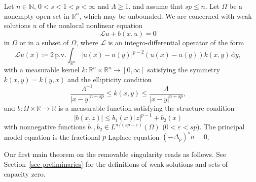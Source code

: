 \documentclass[11pt]{amsart}
\theoremstyle{plain}
\theoremstyle{definition}
\numberwithin{equation}{section}
\begin{document}
	Let $n \in \mathbb{N}$, $0<s<1<p<\infty$ and $\Lambda \geq 1$, and assume that $sp \leq n$. Let $\Omega$ be a nonempty open set in $\mathbb{R}^n$, which may be unbounded. We are concerned with weak solutions $u$ of the nonlocal nonlinear equation
	\begin{equation}\label{eq-main}
		\mathcal{L}u+b(x, u)=0
	\end{equation}
	in $\Omega$ or in a subset of $\Omega$, where $\mathcal{L}$ is an integro-differential operator of the form
	\begin{equation*}
		\mathcal{L}u(x) \coloneqq 2\, \mathrm{p.v.} \int_{\mathbb{R}^n} |u(x)-u(y)|^{p-2} (u(x)-u(y)) k(x, y) \,\mathrm{d}y,
	\end{equation*}
	with a measurable kernel $k: \mathbb{R}^n \times \mathbb{R}^n \to [0, \infty]$ satisfying the symmetry $k(x, y)=k(y, x)$ and the ellipticity condition
	\begin{equation}\label{eq-ellipticity}
		\frac{\Lambda^{-1}}{|x-y|^{n+sp}} \leq k(x, y) \leq \frac{\Lambda}{|x-y|^{n+sp}},
	\end{equation}
    and $b: \Omega \times \mathbb{R} \to \mathbb{R}$ is a measurable function satisfying the structure condition
	\begin{equation}\label{eq-str}
		|b(x, z)| \leq b_1(x) |z|^{p-1} + b_2(x)
	\end{equation}
	with nonnegative functions $b_1, b_2 \in L^{n/(sp-\varepsilon)}(\Omega)$ ($0<\varepsilon<sp$). The principal model equation is the fractional $p$-Laplace equation $(-\Delta_p)^su=0$.
	
	Our first main theorem on the removable singularity reads as follows. See Section~\ref{sec-preliminaries} for the definitions of weak solutions and sets of capacity zero.
 
\end{document}
